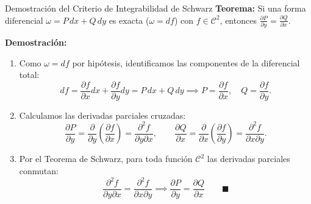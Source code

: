 \documentclass[10pt,aspectratio=169]{beamer}
\begin{document}
\begin{frame}{Demostración del Criterio de Integrabilidad de Schwarz}
  \footnotesize
  \textbf{Teorema:} Si una forma diferencial $\omega = P\,dx + Q\,dy$ es exacta ($\omega = df$) con $f \in \mathcal{C}^2$, entonces $\frac{\partial P}{\partial y} = \frac{\partial Q}{\partial x}$.

  \vspace{0.2cm}
  \textbf{Demostración:}
  \begin{enumerate}\itemsep2pt
    \item Como $\omega = df$ por hipótesis, identificamos las componentes de la diferencial total:
    \[
    df = \frac{\partial f}{\partial x} dx + \frac{\partial f}{\partial y} dy = P\,dx + Q\,dy \implies P = \frac{\partial f}{\partial x}, \quad Q = \frac{\partial f}{\partial y}.
    \]
    \item Calculamos las derivadas parciales cruzadas:
    \[
    \frac{\partial P}{\partial y} = \frac{\partial}{\partial y}\left(\frac{\partial f}{\partial x}\right) = \frac{\partial^2 f}{\partial y \partial x}, \qquad
    \frac{\partial Q}{\partial x} = \frac{\partial}{\partial x}\left(\frac{\partial f}{\partial y}\right) = \frac{\partial^2 f}{\partial x \partial y}.
    \]
    \item Por el Teorema de Schwarz, para toda función $\mathcal{C}^2$ las derivadas parciales conmutan:
    \[
    \frac{\partial^2 f}{\partial y \partial x} = \frac{\partial^2 f}{\partial x \partial y} \implies \boxed{\frac{\partial P}{\partial y} = \frac{\partial Q}{\partial x}} \qquad \blacksquare
    \]
  \end{enumerate}
\end{frame}
\end{document}
